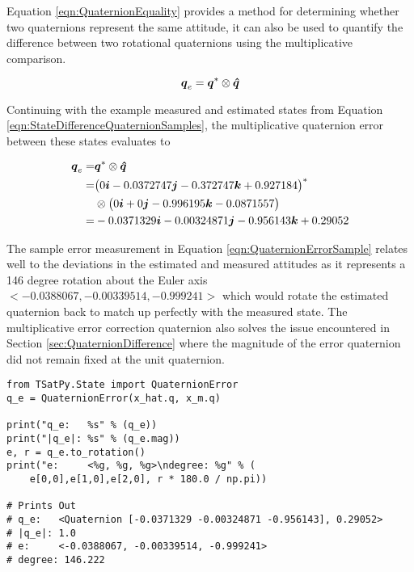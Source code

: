 Equation \ref{eqn:QuaternionEquality} provides a method for determining whether two quaternions represent the same attitude, it can also be used to quantify the difference between two rotational quaternions using the multiplicative comparison.

\begin{equation}
  \boldsymbol{q}_e = \boldsymbol{q}^* \otimes \boldsymbol{\hat{q}}
  \label{eqn:QuaternionError}
\end{equation}

Continuing with the example measured and estimated states from Equation \ref{eqn:StateDifferenceQuaternionSamples}, the multiplicative quaternion error between these states evaluates to

\begin{equation}
  \begin{aligned}
    \boldsymbol{q}_e = & \boldsymbol{q}^* \otimes \boldsymbol{\hat{q}} \\
    = & \big( 0 \boldsymbol{i} -0.0372747 \boldsymbol{j} -0.372747 \boldsymbol{k} +0.927184 \big)^* \\
    & \otimes \big( 0 \boldsymbol{i} +0 \boldsymbol{j} -0.996195 \boldsymbol{k} -0.0871557 \big)\\
    = & -0.0371329 \boldsymbol{i} -0.00324871 \boldsymbol{j} -0.956143 \boldsymbol{k} +0.29052
  \end{aligned}
  \label{eqn:QuaternionErrorSample}
\end{equation}

The sample error measurement in Equation \ref{eqn:QuaternionErrorSample} relates well to the deviations in the estimated and measured attitudes as it represents a 146 degree rotation about the Euler axis $<-0.0388067, -0.00339514, -0.999241>$ which would rotate the estimated quaternion back to match up perfectly with the measured state.  The multiplicative error correction quaternion also solves the issue encountered in Section \ref{sec:QuaternionDifference} where the magnitude of the error quaternion did not remain fixed at the unit quaternion.

\begin{singlespace}
  \begin{verbatim}
from TSatPy.State import QuaternionError
q_e = QuaternionError(x_hat.q, x_m.q)

print("q_e:   %s" % (q_e))
print("|q_e|: %s" % (q_e.mag))
e, r = q_e.to_rotation()
print("e:     <%g, %g, %g>\ndegree: %g" % (
    e[0,0],e[1,0],e[2,0], r * 180.0 / np.pi))

# Prints Out
# q_e:   <Quaternion [-0.0371329 -0.00324871 -0.956143], 0.29052>
# |q_e|: 1.0
# e:     <-0.0388067, -0.00339514, -0.999241>
# degree: 146.222
  \end{verbatim}
\nocite{minted}
\end{singlespace}

